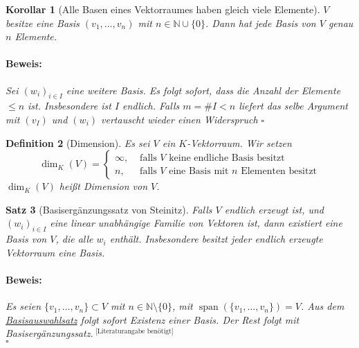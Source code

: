 \documentclass{report}
\newcommand{\IN}[1]{\index{#1|BH}}
\newcommand{\N}{\mathbb{N}}
\DeclareMathOperator{\Span}{span}
\theoremstyle{customrem}
\theoremstyle{customdef}
\newtheorem{definition}{Definition}[chapter]
\newtheorem{korrolar}[definition]{Korollar}
\newtheorem{satz}[definition]{Satz}
\renewenvironment{proof}{\vspace{-.75cm}\paragraph{Beweis: }}{\vspace{-.5cm}\hfill$\square$}
\begin{document}
	\begin{korrolar}[Alle Basen eines Vektorraumes haben gleich viele Elemente]
		$V$ besitze eine Basis $(v_1, \dots, v_n)$ mit $n \in \N \cup \{0\}$. Dann hat jede Basis von $V$ genau $n$ Elemente.\\
		
		\begin{proof}
			Sei $(w_i)_{i \in I}$ eine weitere Basis. Es folgt sofort, dass die Anzahl der Elemente $\le n$ ist. Insbesondere ist $I$ endlich. Falls $m = \#I < n$ liefert das selbe Argument mit $(v_I)$ und $(w_i)$ vertauscht wieder einen Widerspruch \Lightning
		\end{proof}
	\end{korrolar}
	\vspace{.25cm}
	\begin{definition}[Dimension]
		\IN{Vektorraum!Dimension}
		Es sei $V$ ein $K$-Vektorraum. Wir setzen
		$$\dim_K(V) = \begin{cases}\infty,&\text{ falls $V$ keine endliche Basis besitzt}\\n,&\text{ falls $V$ eine Basis mit $n$ Elementen besitzt}\end{cases}$$
		$\dim_K(V)$ heißt Dimension von $V$.
	\end{definition}
	
	\begin{satz}[Basisergänzungssatz von Steinitz]
		\label{satz218}
		Falls $V$ endlich erzeugt ist, und $(w_i)_{i \in I}$ eine linear unabhängige Familie von Vektoren ist, dann existiert eine Basis von $V$, die alle $w_i$ enthält. Insbesondere besitzt jeder endlich erzeugte Vektorraum eine Basis.\\
		
		\begin{proof}
			Es seien $\{v_1, \dots, v_n\} \subset V$ mit $n \in \N \setminus\{0\}$, mit $\Span(\{v_1, \dots, v_n\}) = V$. Aus dem \hyperref[satz213]{Basisauswahlsatz} folgt sofort Existenz einer Basis. Der Rest folgt mit Basisergänzungssatz.$^{\text{ [Literaturangabe benötigt]}}$\\
		\end{proof}
	\end{satz}
	
\end{document}
